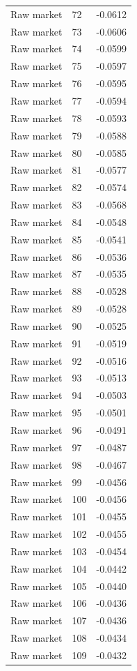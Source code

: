 \begin{table}[htbp]
\begin{tabular}{lll}
Raw market & 72 & -0.0612 \\
Raw market & 73 & -0.0606 \\
Raw market & 74 & -0.0599 \\
Raw market & 75 & -0.0597 \\
Raw market & 76 & -0.0595 \\
Raw market & 77 & -0.0594 \\
Raw market & 78 & -0.0593 \\
Raw market & 79 & -0.0588 \\
Raw market & 80 & -0.0585 \\
Raw market & 81 & -0.0577 \\
Raw market & 82 & -0.0574 \\
Raw market & 83 & -0.0568 \\
Raw market & 84 & -0.0548 \\
Raw market & 85 & -0.0541 \\
Raw market & 86 & -0.0536 \\
Raw market & 87 & -0.0535 \\
Raw market & 88 & -0.0528 \\
Raw market & 89 & -0.0528 \\
Raw market & 90 & -0.0525 \\
Raw market & 91 & -0.0519 \\
Raw market & 92 & -0.0516 \\
Raw market & 93 & -0.0513 \\
Raw market & 94 & -0.0503 \\
Raw market & 95 & -0.0501 \\
Raw market & 96 & -0.0491 \\
Raw market & 97 & -0.0487 \\
Raw market & 98 & -0.0467 \\
Raw market & 99 & -0.0456 \\
Raw market & 100 & -0.0456 \\
Raw market & 101 & -0.0455 \\
Raw market & 102 & -0.0455 \\
Raw market & 103 & -0.0454 \\
Raw market & 104 & -0.0442 \\
Raw market & 105 & -0.0440 \\
Raw market & 106 & -0.0436 \\
Raw market & 107 & -0.0436 \\
Raw market & 108 & -0.0434 \\
Raw market & 109 & -0.0432 \\

\end{tabular}
\end{table}
